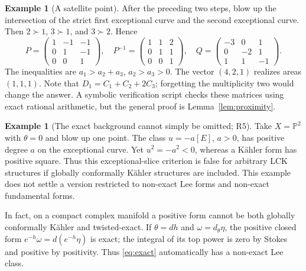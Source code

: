 \documentclass[12pt]{amsart}
\theoremstyle{definition}
\newtheorem{eg}[thm]{Example}
\theoremstyle{remark}
\numberwithin{equation}{section}
\newcommand{\mP}{\mathbb{P}}
\begin{document}
\begin{eg}[A satellite point]\label{ex:satellite}
After the preceding two steps, blow up the intersection of the strict first exceptional curve and the second exceptional curve. Then $2\succ1$, $3\succ1$, and $3\succ2$. Hence
\begin{equation}\label{eq:satellite}
 P=\begin{pmatrix}1&-1&-1\\0&1&-1\\0&0&1\end{pmatrix},\quad
 P^{-1}=\begin{pmatrix}1&1&2\\0&1&1\\0&0&1\end{pmatrix},\quad
 Q=\begin{pmatrix}-3&0&1\\0&-2&1\\1&1&-1\end{pmatrix}.
\end{equation}
The inequalities are $a_1>a_2+a_3$, $a_2>a_3>0$. The vector $(4,2,1)$ realizes areas $(1,1,1)$. Note that $D_1=C_1+C_2+2C_3$; forgetting the multiplicity two would change the answer. A symbolic verification script checks these matrices using exact rational arithmetic, but the general proof is Lemma~\ref{lem:proximity}.
\end{eg}

\begin{eg}[The exact background cannot simply be omitted; R5]\label{ex:kahler}
Take $X=\mP^2$ with $\theta=0$ and blow up one point. The class $u=-a[E]$, $a>0$, has positive degree $a$ on the exceptional curve. Yet $u^2=-a^2<0$, whereas a K\"ahler form has positive square. Thus this exceptional-slice criterion is false for arbitrary LCK structures if globally conformally K\"ahler structures are included. This example does not settle a version restricted to non-exact Lee forms and non-exact fundamental forms.

In fact, on a compact complex manifold a positive form cannot be both globally conformally K\"ahler and twisted-exact. If $\theta=dh$ and $\omega=d_\theta\eta$, the positive closed form $e^{-h}\omega=d(e^{-h}\eta)$ is exact; the integral of its top power is zero by Stokes and positive by positivity. Thus \eqref{eq:exact} automatically has a non-exact Lee class.
\end{eg}
\end{document}
